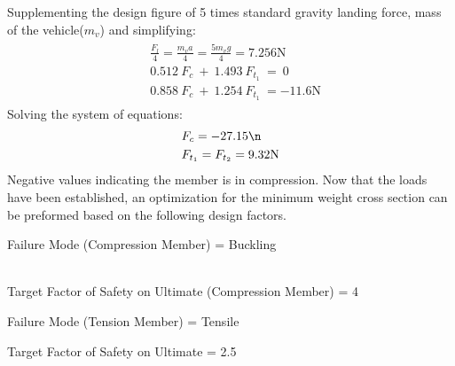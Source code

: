 \documentclass[12pt,letterpaper]{article}
\begin{document}
Supplementing the design figure of 5 times standard gravity landing force, mass of the vehicle($m_v$) and simplifying:
\begin{gather}
\begin{aligned}
   & \frac{F_l}{4} = \frac{m_va}{4} = \frac{5m_vg}{4} = 7.256\unit{\N}
    \\
    & 0.512~F_c~+~1.493~F_{t_1}~=~0 
    \\
    & 0.858~F_c~+~1.254~F_{t_1}~= -11.6\unit{\N}
\end{aligned}
\end{gather}
Solving the system of equations:
\begin{gather}
\begin{aligned}
    &F_c = -27.15\unit{\n}
    \\
    &F_{t_1} = F_{t_2} = 9.32\unit{\N}
\end{aligned}
\end{gather}
Negative values indicating the member is in compression. Now that the loads have been established, an optimization for the minimum weight cross section can be preformed based on the following design factors.
\\
\begin{description}
   \item Failure Mode (Compression Member) = Buckling\\\\
   \item Target Factor of Safety on Ultimate (Compression Member) = 4
    \item Failure Mode (Tension Member) = Tensile
    \item Target Factor of Safety on Ultimate = 2.5
\end{description}
\end{document}
